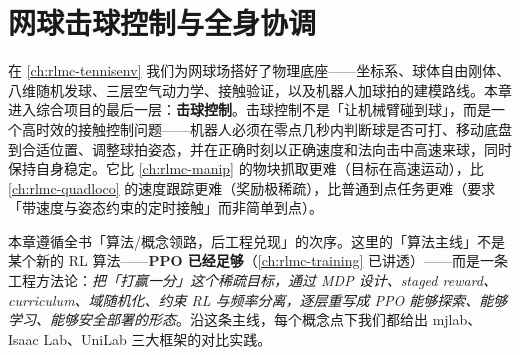 \chapter{网球击球控制与全身协调}\label{ch:rlmc-tenniscontrol}


在 \cref{ch:rlmc-tennisenv} 我们为网球场搭好了物理底座——坐标系、球体自由刚体、八维随机发球、三层空气动力学、接触验证，以及机器人加球拍的建模路线。本章进入综合项目的最后一层：\textbf{击球控制}。击球控制不是「让机械臂碰到球」，而是一个高时效的接触控制问题——机器人必须在零点几秒内判断球是否可打、移动底盘到合适位置、调整球拍姿态，并在正确时刻以正确速度和法向击中高速来球，同时保持自身稳定。它比 \cref{ch:rlmc-manip} 的物块抓取更难（目标在高速运动），比 \cref{ch:rlmc-quadloco} 的速度跟踪更难（奖励极稀疏），比普通到点任务更难（要求「带速度与姿态约束的定时接触」而非简单到点）。

本章遵循全书「算法/概念领路，后工程兑现」的次序。这里的「算法主线」不是某个新的 RL 算法——\textbf{PPO 已经足够}（\cref{ch:rlmc-training} 已讲透）——而是一条工程方法论：\emph{把「打赢一分」这个稀疏目标，通过 MDP 设计、staged reward、curriculum、域随机化、约束 RL 与频率分离，逐层重写成 PPO 能够探索、能够学习、能够安全部署的形态}。沿这条主线，每个概念点下我们都给出 mjlab、Isaac Lab、UniLab 三大框架的对比实践。

